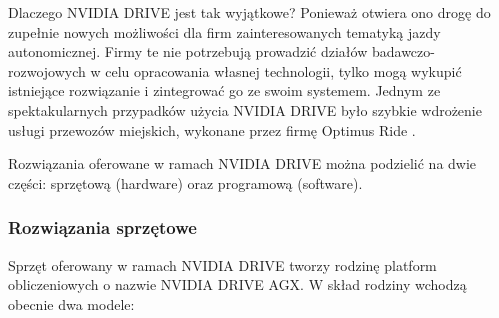 Dlaczego NVIDIA DRIVE jest tak wyjątkowe? Ponieważ otwiera ono drogę do zupełnie nowych możliwości dla firm zainteresowanych tematyką jazdy autonomicznej. Firmy te nie potrzebują prowadzić działów badawczo-rozwojowych w celu opracowania własnej technologii, tylko mogą wykupić istniejące rozwiązanie i zintegrować go ze swoim systemem. Jednym ze spektakularnych przypadków użycia NVIDIA DRIVE było szybkie wdrożenie usługi przewozów miejskich, wykonane przez firmę Optimus Ride \cite{nvidiaDrive:optimusRide}.

Rozwiązania oferowane w ramach NVIDIA DRIVE można podzielić na dwie części: sprzętową (hardware) oraz programową (software).

\subsubsection{Rozwiązania sprzętowe}
Sprzęt oferowany w ramach NVIDIA DRIVE tworzy rodzinę platform obliczeniowych o nazwie NVIDIA DRIVE AGX. W skład rodziny wchodzą obecnie dwa modele:
